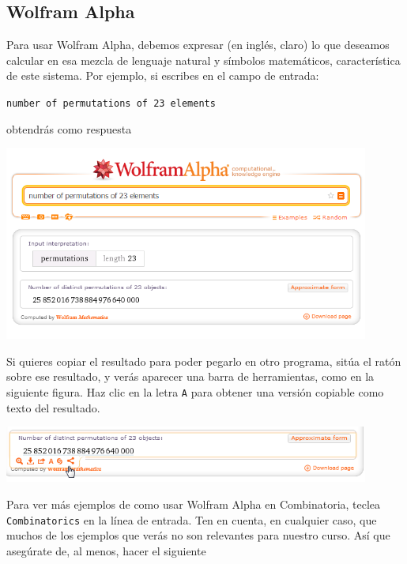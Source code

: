 \documentclass[10pt,a4paper]{article}\usepackage[]{graphicx}\usepackage[]{color}
\begin{document}
\subsection{Wolfram Alpha}
\label{tut03:subsec:CombinatoriaWolframAlpha}

Para usar Wolfram Alpha, debemos expresar (en inglés, claro) lo que deseamos calcular en esa mezcla de lenguaje natural y símbolos matemáticos, característica de este sistema. Por ejemplo, si escribes en el campo de entrada:
     \begin{center}
{\tt number of permutations of 23 elements}
\end{center}
obtendrás como respuesta
\begin{center}
\includegraphics[width=12cm]{./fig/Tut05-08.png}
\end{center}
Si quieres copiar el resultado para poder pegarlo en otro programa, sitúa el ratón sobre ese resultado, y verás aparecer una barra de herramientas, como en la siguiente figura. Haz clic en la letra {\tt A} para obtener una versión copiable como texto del resultado.
\begin{center}
\includegraphics[width=12cm]{./fig/Tut05-09.png}
\end{center}
Para ver más ejemplos de como usar Wolfram Alpha en Combinatoria, teclea {\tt Combinatorics} en la línea de entrada. Ten en cuenta, en cualquier caso, que muchos de los ejemplos que verás no son relevantes para nuestro curso. Así que asegúrate de, al menos, hacer el siguiente
\end{document}
